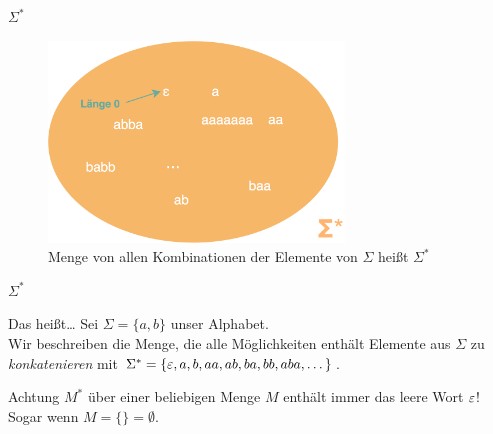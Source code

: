 %
%
%
%

\begin{frame}[fragile]{$\Sigma^\ast$}
\begin{figure}
    \centering
    \includegraphics[width=0.7\textwidth]{../figures/SigmaSternEpsilon.png}
    \caption{Menge von allen Kombinationen der Elemente von $\Sigma$ heißt $\Sigma^\ast$}
\end{figure}
\end{frame}

\begin{frame}[fragile]{$\Sigma^\ast$}
    \begin{exampleblock}{Das heißt\dots}
    Sei $\Sigma = \{a,b\}$ unser \alert{Alphabet}.\\
    Wir beschreiben die Menge, die alle Möglichkeiten enthält Elemente aus $\Sigma$ zu \emph{konkatenieren} mit $\Sigma^\ast=\{\varepsilon,a,b,aa,ab,ba,bb,aba,\dots\}$.
    \end{exampleblock}\pause
    
    \begin{alertblock}{Achtung}
    $M^\ast$ über einer beliebigen Menge $M$ enthält immer das leere Wort $\varepsilon$!\\
    Sogar wenn $M = \{\} = \emptyset$.\\
    
    \end{alertblock}
\end{frame}

